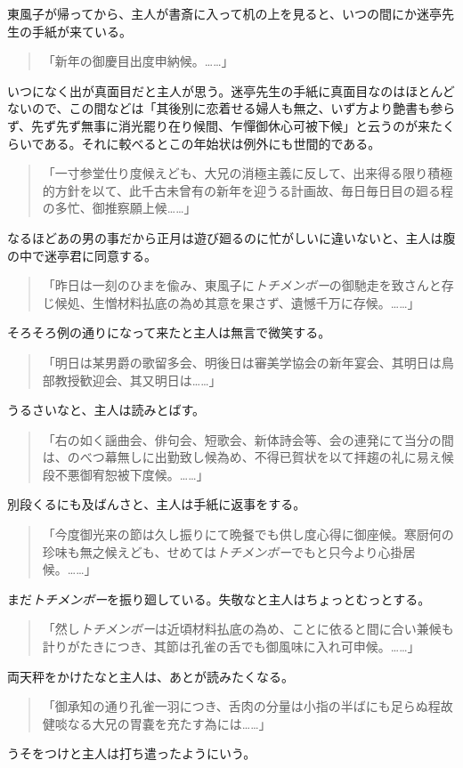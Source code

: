 \documentclass[12pt, openright]{book}
\begin{document}
東風子が帰ってから、主人が書斎に入って机の上を見ると、いつの間にか迷亭先生の手紙が来ている。

\blockquote{「新年の御慶目出度申納候。\ldots{}\ldots{}」}

いつになく出が真面目だと主人が思う。迷亭先生の手紙に真面目なのはほとんどないので、この間などは「其後別に恋着せる婦人も無之、いず方より艶書も参らず、先ず先ず無事に消光罷り在り候間、乍憚御休心可被下候」と云うのが来たくらいである。それに較べるとこの年始状は例外にも世間的である。

\blockquote{「一寸参堂仕り度候えども、大兄の消極主義に反して、出来得る限り積極的方針を以て、此千古未曾有の新年を迎うる計画故、毎日毎日目の廻る程の多忙、御推察願上候\ldots{}\ldots{}」}

なるほどあの男の事だから正月は遊び廻るのに忙がしいに違いないと、主人は腹の中で迷亭君に同意する。

\blockquote{「昨日は一刻のひまを偸み、東風子に\emph{トチメンボー}の御馳走を致さんと存じ候処、生憎材料払底の為め其意を果さず、遺憾千万に存候。\ldots{}\ldots{}」}

そろそろ例の通りになって来たと主人は無言で微笑する。

\blockquote{「明日は某男爵の歌留多会、明後日は審美学協会の新年宴会、其明日は鳥部教授歓迎会、其又明日は\ldots{}\ldots{}」}

うるさいなと、主人は読みとばす。

\blockquote{「右の如く謡曲会、俳句会、短歌会、新体詩会等、会の連発にて当分の間は、のべつ幕無しに出勤致し候為め、不得已賀状を以て拝趨の礼に易え候段不悪御宥恕被下度候。\ldots{}\ldots{}」}

別段くるにも及ばんさと、主人は手紙に返事をする。

\blockquote{「今度御光来の節は久し振りにて晩餐でも供し度心得に御座候。寒厨何の珍味も無之候えども、せめては\emph{トチメンボー}でもと只今より心掛居候。\ldots{}\ldots{}」}

まだ\emph{トチメンボー}を振り廻している。失敬なと主人はちょっとむっとする。

\blockquote{「然し\emph{トチメンボー}は近頃材料払底の為め、ことに依ると間に合い兼候も計りがたきにつき、其節は孔雀の舌でも御風味に入れ可申候。\ldots{}\ldots{}」}

両天秤をかけたなと主人は、あとが読みたくなる。

\blockquote{「御承知の通り孔雀一羽につき、舌肉の分量は小指の半ばにも足らぬ程故健啖なる大兄の胃嚢を充たす為には\ldots{}\ldots{}」}

うそをつけと主人は打ち遣ったようにいう。
\end{document}
